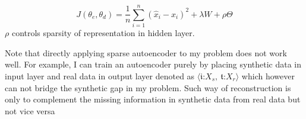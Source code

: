 \documentclass{iitthesis}
\begin{document}
\begin{equation}
J(\theta_{e},\theta_{d})=\frac{1}{n}\sum_{i=1}^{n}(\hat{x}_{i}-x_{i})^{2}+\lambda W+\rho\Theta\label{Equ: SparsityObjective}
\end{equation}
$\rho$ controls sparsity of representation in hidden layer.



Note that directly applying sparse autoencoder to my problem does not work well. For example, I can train an autoencoder purely by placing synthetic data in input layer and real data in output layer denoted as $\langle\mathfrak{i}\text{:}X_{s},\:\mathfrak{t}\text{:}X_{r}\rangle$ which however can not bridge the synthetic gap in my problem. Such way of reconstruction is only to complement the missing information in synthetic data from real data but not vice versa
\end{document}
